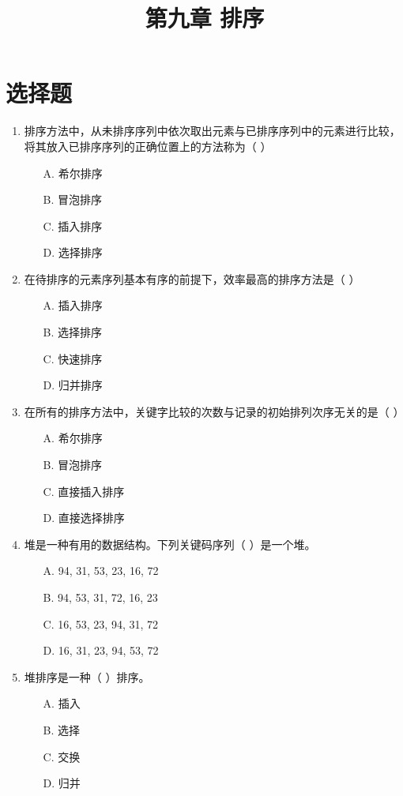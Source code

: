 \documentclass[12pt, a4paper]{article}
\title{\textbf{第九章 排序}}
\author{}
\date{}
\begin{document}
\section*{选择题}

\begin{enumerate}[label=\arabic*.]
	\item 排序方法中，从未排序序列中依次取出元素与已排序序列中的元素进行比较，将其放入已排序序列的正确位置上的方法称为（ ）
	      \begin{enumerate}
		      \item[A.] 希尔排序
		      \item[B.] 冒泡排序
		      \item[C.] 插入排序
		      \item[D.] 选择排序
	      \end{enumerate}

	\item 在待排序的元素序列基本有序的前提下，效率最高的排序方法是（ ）
	      \begin{enumerate}
		      \item[A.] 插入排序
		      \item[B.] 选择排序
		      \item[C.] 快速排序
		      \item[D.] 归并排序
	      \end{enumerate}

	\item 在所有的排序方法中，关键字比较的次数与记录的初始排列次序无关的是（ ）
	      \begin{enumerate}
		      \item[A.] 希尔排序
		      \item[B.] 冒泡排序
		      \item[C.] 直接插入排序
		      \item[D.] 直接选择排序
	      \end{enumerate}

	\item 堆是一种有用的数据结构。下列关键码序列（ ）是一个堆。
	      \begin{enumerate}
		      \item[A.] 94, 31, 53, 23, 16, 72
		      \item[B.] 94, 53, 31, 72, 16, 23
		      \item[C.] 16, 53, 23, 94, 31, 72
		      \item[D.] 16, 31, 23, 94, 53, 72
	      \end{enumerate}

	\item 堆排序是一种（ ）排序。
	      \begin{enumerate}
		      \item[A.] 插入
		      \item[B.] 选择
		      \item[C.] 交换
		      \item[D.] 归并
	      \end{enumerate}


\end{enumerate}
\end{document}
